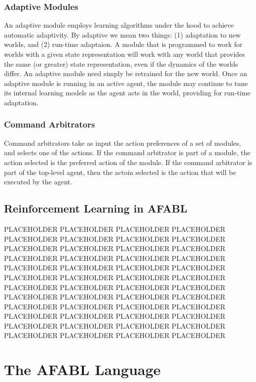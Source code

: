 \subsubsection{Adaptive Modules}

An adaptive module employs learning algorithms under the hood to
achieve automatic adaptivity.  By adaptive we mean two things: (1)
adaptation to new worlds, and (2) run-time adaptaion.  A module that
is programmed to work for worlds with a given state representation
will work with any world that provides the same (or greater) state
representation, even if the dynamics of the worlds differ.  An
adaptive module need simply be retrained for the new world.  Once an
adaptive module is running in an active agent, the module may continue
to tune its internal learning models as the agent acts in the world,
providing for run-time adaptation.

\subsubsection{Command Arbitrators}

Command arbitrators take as input the action preferences of a set of
modules, and selects one of the actions.  If the command arbitrator is
part of a module, the action selected is the preferred action of the
module.  If the command arbitrator is part of the top-level agent,
then the actoin selected is the action that will be executed by the
agent.

\subsection{Reinforcement Learning in AFABL}

PLACEHOLDER PLACEHOLDER PLACEHOLDER PLACEHOLDER PLACEHOLDER PLACEHOLDER PLACEHOLDER PLACEHOLDER PLACEHOLDER PLACEHOLDER PLACEHOLDER PLACEHOLDER PLACEHOLDER PLACEHOLDER PLACEHOLDER PLACEHOLDER PLACEHOLDER PLACEHOLDER PLACEHOLDER PLACEHOLDER PLACEHOLDER PLACEHOLDER PLACEHOLDER PLACEHOLDER PLACEHOLDER PLACEHOLDER PLACEHOLDER PLACEHOLDER PLACEHOLDER PLACEHOLDER PLACEHOLDER PLACEHOLDER PLACEHOLDER PLACEHOLDER PLACEHOLDER PLACEHOLDER PLACEHOLDER PLACEHOLDER PLACEHOLDER PLACEHOLDER PLACEHOLDER PLACEHOLDER PLACEHOLDER PLACEHOLDER PLACEHOLDER PLACEHOLDER PLACEHOLDER PLACEHOLDER

\section{The AFABL Language}

